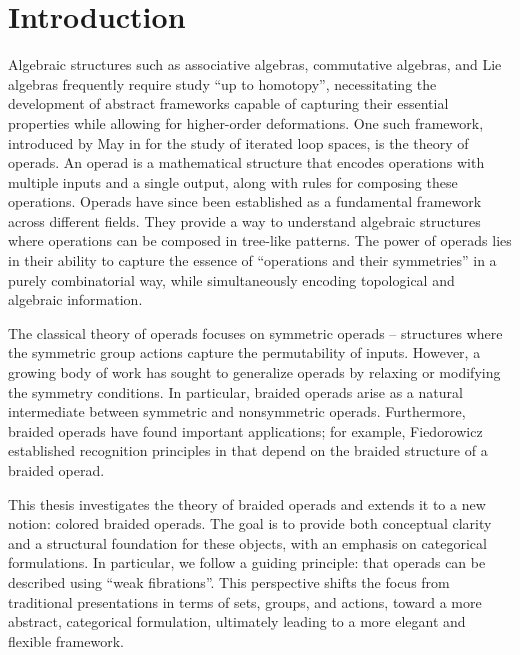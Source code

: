 
\section{Introduction}

Algebraic structures such as associative algebras, commutative algebras, and Lie
algebras frequently require study ``up to homotopy'', necessitating the
development of abstract frameworks capable of capturing their essential
properties while allowing for higher-order deformations. One such framework,
introduced by May in \cite{may1972} for the study of iterated loop spaces, is the
theory of operads. 
An operad is a mathematical structure that encodes operations
with multiple inputs and a single output, along with rules for composing these
operations. Operads have since been established as a fundamental framework
across different fields. They provide a way to understand algebraic structures
where operations can be composed in tree-like patterns. The power of operads
lies in their ability to capture the essence of ``operations and their
symmetries'' in a purely combinatorial way, while simultaneously encoding
topological and algebraic information.

The classical theory of operads focuses on symmetric operads -- structures where
the symmetric group actions capture the permutability of inputs. However, a
growing body of work has sought to generalize operads by relaxing or modifying
the symmetry conditions. In particular, braided operads arise as a natural
intermediate between symmetric and nonsymmetric operads. Furthermore, braided
operads have found important applications; for example, Fiedorowicz established
recognition principles in \cite{EO} that depend on the braided structure of a
braided operad.

\medskip

This thesis investigates the theory of braided operads and extends it to a new
notion: colored braided operads. The goal is to provide both conceptual clarity
and a structural foundation for these objects, with an emphasis on categorical
formulations. In particular, we follow a guiding principle: that operads can be
described using ``weak fibrations''. This perspective shifts the focus from
traditional presentations in terms of sets, groups, and actions, toward a more
abstract, categorical formulation, ultimately leading to a more elegant and
flexible framework.


